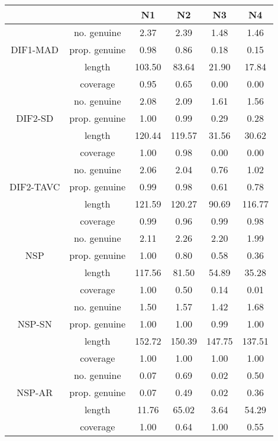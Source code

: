 \begin{tabular}{|c|c|c|c|c|c|}
  \hline
 &  & N1 & N2 & N3 & N4 \\ 
  \hline
 & no. genuine & 2.37 & 2.39 & 1.48 & 1.46 \\ 
  DIF1-MAD & prop. genuine & 0.98 & 0.86 & 0.18 & 0.15 \\ 
   & length & 103.50 & 83.64 & 21.90 & 17.84 \\ 
   & coverage & 0.95 & 0.65 & 0.00 & 0.00 \\ 
   & no. genuine & 2.08 & 2.09 & 1.61 & 1.56 \\ 
  DIF2-SD & prop. genuine & 1.00 & 0.99 & 0.29 & 0.28 \\ 
   & length & 120.44 & 119.57 & 31.56 & 30.62 \\ 
   & coverage & 1.00 & 0.98 & 0.00 & 0.00 \\ 
   & no. genuine & 2.06 & 2.04 & 0.76 & 1.02 \\ 
  DIF2-TAVC & prop. genuine & 0.99 & 0.98 & 0.61 & 0.78 \\ 
   & length & 121.59 & 120.27 & 90.69 & 116.77 \\ 
   & coverage & 0.99 & 0.96 & 0.99 & 0.98 \\ 
   & no. genuine & 2.11 & 2.26 & 2.20 & 1.99 \\ 
  NSP & prop. genuine & 1.00 & 0.80 & 0.58 & 0.36 \\ 
   & length & 117.56 & 81.50 & 54.89 & 35.28 \\ 
   & coverage & 1.00 & 0.50 & 0.14 & 0.01 \\ 
   & no. genuine & 1.50 & 1.57 & 1.42 & 1.68 \\ 
  NSP-SN & prop. genuine & 1.00 & 1.00 & 0.99 & 1.00 \\ 
   & length & 152.72 & 150.39 & 147.75 & 137.51 \\ 
   & coverage & 1.00 & 1.00 & 1.00 & 1.00 \\ 
   & no. genuine & 0.07 & 0.69 & 0.02 & 0.50 \\ 
  NSP-AR & prop. genuine & 0.07 & 0.49 & 0.02 & 0.36 \\ 
   & length & 11.76 & 65.02 & 3.64 & 54.29 \\ 
   & coverage & 1.00 & 0.64 & 1.00 & 0.55 \\ 
   \hline
\end{tabular}

